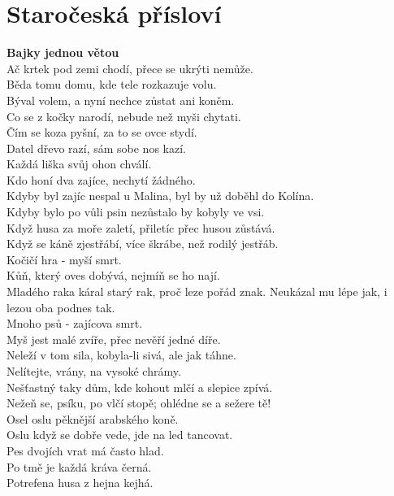 \section{Staročeská přísloví}
\begin{multicols}{\value{columnsgames}}

\noindent
{\large\bf Bajky jednou větou}\\[1 mm]
Ač krtek pod zemi chodí, přece se ukrýti nemůže.\\
Běda tomu domu, kde tele rozkazuje volu.\\
Býval volem, a nyní nechce zůstat ani koněm.\\
Co se z kočky narodí, nebude než myši chytati.\\
Čím se koza pyšní, za to se ovce stydí.\\
Datel dřevo razí, sám sobe nos kazí.\\
Každá liška svůj ohon chválí.\\
Kdo honí dva zajíce, nechytí žádného.\\
Kdyby byl zajíc nespal u Malina, byl by už doběhl do Kolína.\\
Kdyby bylo po vůli psin nezůstalo by kobyly ve vsi.\\
Když husa za moře zaletí, přiletíc přec husou zůstává.\\
Když se káně zjestřábí, více škrábe, než rodilý jestřáb.\\
Kočičí hra - myší smrt.\\
Kůň, který oves dobývá, nejmíň se ho nají.\\
Mladého raka káral starý rak, proč leze pořád znak. Neukázal
mu lépe jak, i lezou oba podnes tak.\\
Mnoho psů - zajícova smrt.\\
Myš jest malé zvíře, přec nevěří jedné díře.\\
Neleží v tom sila, kobyla-li sivá, ale jak táhne.\\
Nelítejte, vrány, na vysoké chrámy.\\
Nešťastný taky dům, kde kohout mlčí a slepice zpívá.\\
Nežeň se, psíku, po vlčí stopě; ohlédne se a sežere tě!\\
Osel oslu pěknější arabského koně.\\
Oslu když se dobře vede, jde na led tancovat.\\
Pes dvojích vrat má často hlad.\\
Po tmě je každá kráva černá.\\
Potrefena husa z hejna kejhá.\\

\end{multicols}
